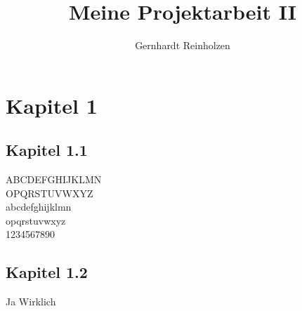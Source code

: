 
\title{Meine Projektarbeit II}
\author{Gernhardt Reinholzen}




%




\section{Kapitel 1}

\subsection{Kapitel 1.1}

ABCDEFGHIJKLMN\\OPQRSTUVWXYZ\\
abcdefghijklmn\\opqrstuvwxyz\\
1234567890

\subsection{Kapitel 1.2}
Ja Wirklich


